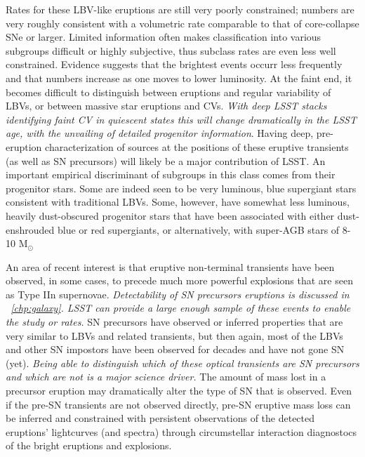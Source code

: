 Rates for these LBV-like eruptions are still very poorly constrained;
numbers are very roughly consistent with a volumetric rate comparable
to that of core-collapse SNe or larger.  %
Limited information often makes classification into various
subgroups difficult or highly subjective, thus subclass rates are even
less well constrained.  %
Evidence suggests that the brightest events occurr less frequently and that
numbers increase as one moves to lower luminosity.  At the faint end,
it becomes difficult to distinguish between eruptions and regular
variability of LBVs, or between massive star eruptions and CVs.  \emph{With
deep LSST stacks identifying faint CV in quiescent states this will
 change dramatically in the LSST age, with the unvailing of
detailed progenitor information}.  Having deep, pre-eruption
characterization of sources at the positions of these eruptive
transients (as well as SN precursors) will likely be a major
contribution of LSST.
An important empirical discriminant of subgroups in this class comes
from their progenitor stars.  Some are indeed seen to be very
luminous, blue supergiant stars consistent with traditional LBVs.
Some, however, have somewhat less luminous, heavily dust-obscured
progenitor stars that have been associated with either dust-enshrouded
blue or red supergiants, or alternatively, with super-AGB stars of
8-10 M$_{\odot}$%


An area of recent interest is that eruptive non-terminal transients
have been observed, in some cases, to precede much more powerful
explosions that are seen as Type IIn supernovae.  \emph{Detectability of SN
precursors eruptions is discussed in ~\autoref{chp:galaxy}.
LSST can provide a large enough sample of these events to enable the study
or rates.} %
SN
precursors have observed or inferred properties that are very similar
to LBVs and related transients,
but then again, most of the LBVs and other SN impostors have been
observed for decades and have not gone SN (yet).  \emph{Being able to
  distinguish which of these optical transients are SN precursors and
  which are not is a major science driver.}  The amount of mass lost
in a precursor eruption may dramatically alter the type of SN that is
observed.  Even if the pre-SN transients are not observed directly,
pre-SN eruptive mass loss can be inferred and constrained with
persistent observations of the detected eruptions' lightcurves (and
spectra) through circumstellar interaction diagnostocs of
the bright eruptions and explosions.

